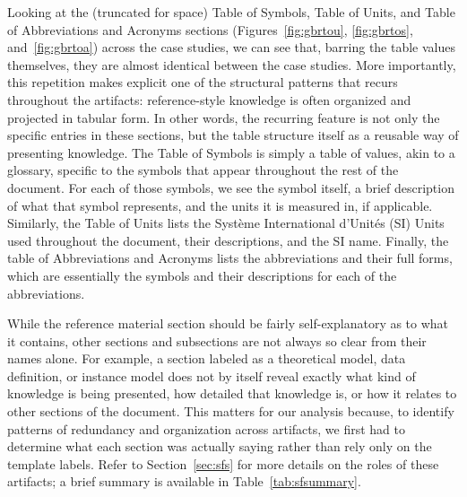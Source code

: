 Looking at the (truncated for space) Table of Symbols, Table of Units, and 
Table of Abbreviations and Acronyms sections (Figures~\ref{fig:gbrtou}, 
\ref{fig:gbrtos}, and~\ref{fig:gbrtoa}) across the case studies, we can see 
that, barring the table values themselves, they are almost identical between 
the case studies. More importantly, this repetition makes explicit one of the 
structural patterns that recurs throughout the artifacts: reference-style 
knowledge is often organized and projected in tabular form. In other words, 
the recurring feature is not only the specific entries in these sections, but 
the table structure itself as a reusable way of presenting knowledge. The Table 
of Symbols is simply a table of values, akin to a glossary, specific to the 
symbols that appear throughout the rest of the document. For each of those 
symbols, we see the symbol itself, a brief description of what that symbol 
represents, and the units it is measured in, if applicable. Similarly, the 
Table of Units lists the Syst\`eme International d'Unit\'es (SI) Units used 
throughout the document, their descriptions, and the SI name. Finally, the 
table of Abbreviations and Acronyms lists the abbreviations and their full 
forms, which are essentially the symbols and their descriptions for each of the 
abbreviations.

While the reference material section should be fairly self-explanatory as to 
what it contains, other sections and subsections are not always so clear from 
their names alone. For example, a section labeled as a theoretical model, data 
definition, or instance model does not by itself reveal exactly what kind of 
knowledge is being presented, how detailed that knowledge is, or how it relates 
to other sections of the document. This matters for our analysis because, to 
identify patterns of redundancy and organization across artifacts, we first had 
to determine what each section was actually saying rather than rely only on the 
template labels. Refer to Section~\ref{sec:sfs} for more details on the roles 
of these artifacts; a brief summary is available in Table~\ref{tab:sfsummary}.

